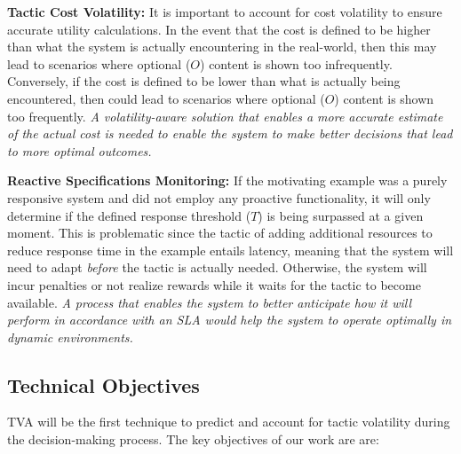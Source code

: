 \documentclass[12pt]{article}
\newcommand{\dan}[1]{\textcolor{blue}{{\it [Dan: #1]}}}
\begin{document}
\vspace{1mm} \noindent \textbf{Tactic Cost Volatility:} It is important to account for cost volatility to ensure accurate utility calculations. In the event that the cost is defined to be higher than what the system is actually encountering in the real-world, then this may lead to scenarios where optional ($O$) content is shown too infrequently. Conversely, if the cost is defined to be lower than what is actually being encountered, then could lead to scenarios where optional ($O$) content is shown too frequently. \emph{A volatility-aware solution that enables a more accurate estimate of the actual cost is needed to enable the system to make better decisions that lead to more optimal outcomes.}

\vspace{1mm} \noindent \textbf{Reactive Specifications Monitoring:} If the motivating example was a purely responsive system and did not employ any proactive functionality, it will only determine if the defined response threshold ($T$) is being surpassed at a given moment. This is problematic since the tactic of adding additional resources to reduce response time in the example entails latency, meaning that the system will need to adapt \emph{before} the tactic is actually needed. Otherwise, the system will incur penalties or not realize rewards while it waits for the tactic to become available. \emph{A process that enables the system to better anticipate how it will perform in accordance with an SLA would help the system to operate optimally in dynamic environments.} %

\vspace{-2mm}
\subsection{Technical Objectives}
TVA will be the first technique to predict and account for tactic volatility during the decision-making process. The key objectives of our work are are:



\end{document}

